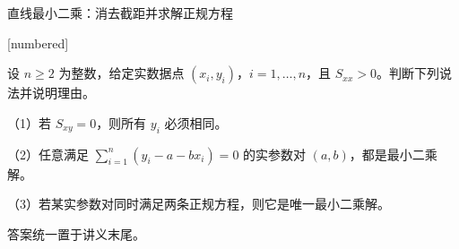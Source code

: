 \documentclass[aspectratio=169,10pt,fontset=fandol]{ctexbeamer}
\makeatletter
\newcommand{\mathagentexerciselabelcontext}[1]{%
\hypertarget<1>{#1}{}%
\edef\@currentHref{#1}%
}
\makeatother
\begin{document}
\begin{frame}[t,fragile]{直线最小二乘：消去截距并求解正规方程}
\normalsize
{\normalsize
[numbered]
\mathagentexerciselabelcontext{mathagent.exercise.U0029.0}
\begin{exercise}
\label{mathagent:exercise:b4c9c9a1fb82bcef052fdbf6e1539831ed88cee016dbcbf83a50e5e8d2311be0}
设 $n\geq2$ 为整数，给定实数据点 $(x_i,y_i)$，$i=1,\ldots,n$，且 $S_{xx}>0$。判断下列说法并说明理由。

（1）若 $S_{xy}=0$，则所有 $y_i$ 必须相同。

（2）任意满足 $\sum_{i=1}^{n}(y_i-a-bx_i)=0$ 的实参数对 $(a,b)$，都是最小二乘解。

（3）若某实参数对同时满足两条正规方程，则它是唯一最小二乘解。

答案统一置于讲义末尾。
\end{exercise}
}
\end{frame}
\end{document}
